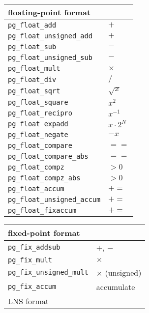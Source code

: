 \documentclass{llncs}
\begin{document}
\begin{table}
\begin{center}
    \begin{minipage}{.45\linewidth}
      \begin{tabular}{ll}
	\hline
	floating-point format & \\
	\hline
	    {\tt pg\_float\_add}           &  $+$\\
	    {\tt pg\_float\_unsigned\_add} &  $+$\\
	    {\tt pg\_float\_sub}           &  $-$\\
	    {\tt pg\_float\_unsigned\_sub} &  $-$\\
	    {\tt pg\_float\_mult}          &  $\times$\\
	    {\tt pg\_float\_div}           &  $/$ \\
	    {\tt pg\_float\_sqrt}          &  $\sqrt{x}$ \\
	    {\tt pg\_float\_square}        &  $x^2$\\
	    {\tt pg\_float\_recipro}       &  $x^{-1}$\\
	    {\tt pg\_float\_expadd}        &  $x \cdot 2^{N}$\\
	    {\tt pg\_float\_negate}        &  $-x$\\
	    {\tt pg\_float\_compare}       &  $==$\\
	    {\tt pg\_float\_compare\_abs}  &  $==$\\
	    {\tt pg\_float\_compz}         &  $>0$\\
	    {\tt pg\_float\_compz\_abs}    &  $>0$\\
	    {\tt pg\_float\_accum}         &  $+=$\\
	    {\tt pg\_float\_unsigned\_accum}& $+=$\\
	    {\tt pg\_float\_fixaccum}      &  $+=$\\
	    \hline
      \end{tabular}
    \end{minipage}
    \hspace{2.3pc}
    \begin{minipage}{.45\linewidth}
      \begin{tabular}{ll}
	\hline
	fixed-point format & \\
	\hline
	{\tt pg\_fix\_addsub}          &  $+$, $-$\\
	{\tt pg\_fix\_mult}            &  $\times$\\
	{\tt pg\_fix\_unsigned\_mult}  &  $\times$ (unsigned)\\
	{\tt pg\_fix\_accum}           &  accumulate\\
	\hline
	LNS format& \\

\end{tabular}
\end{minipage}
\end{center}
\end{table}
\end{document}
